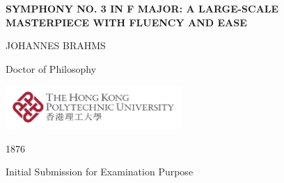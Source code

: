 \thispagestyle{empty}

\begin{center}

\vspace*{3cm}

{\Large \textbf{
SYMPHONY NO. 3 IN F MAJOR: A LARGE-SCALE MASTERPIECE WITH FLUENCY AND EASE
}}

\vspace{2cm}
{\Large JOHANNES BRAHMS}

\vspace{2cm}
{\large Doctor of Philosophy}

\vspace{2cm}
\includegraphics[width=0.5\textwidth]{logo-name.pdf}

\vspace{2cm}

\vspace{1cm}
{\large 1876}

\vspace{1cm}
{\large Initial Submission for Examination Purpose}

\end{center}
